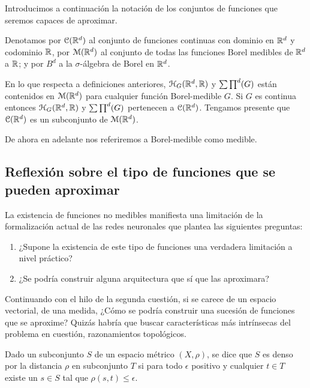 Introducimos a continuación la notación de los conjuntos de funciones que seremos capaces de aproximar.  

Denotamos por  $\mathcal{C}(\mathbb{R}^d)$ al conjunto de funciones continuas con dominio en $\mathbb{R}^d$ y codominio $\mathbb{R}$,
por  $\mathcal{M}(\mathbb{R}^d)$ al conjunto de todas las funciones Borel medibles de $\mathbb{R}^d$ a $\mathbb{R}$; 
y por $B^d$ a la $\sigma$-álgebra de Borel en $\mathbb{R} ^d$. 

En lo que respecta a definiciones anteriores, $\mathcal{H}_G(\mathbb{R}^d,\mathbb{R})$ y $\sum \prod^d (G)$ están contenidos en
$\mathcal{M}(\mathbb{R}^d)$ para cualquier función Borel-medible $G$. Si $G$ es continua entonces 
$\mathcal{H}_G(\mathbb{R}^d,\mathbb{R})$ y $\sum \prod^d (G)$ pertenecen a $\mathcal{C}(\mathbb{R}^d)$. Tengamos presente que $\mathcal{C}(\mathbb{R}^d)$ es un subconjunto
de $\mathcal{M}(\mathbb{R}^d)$.  

De ahora en adelante nos referiremos a Borel-medible como medible. 
  

\subsection{ Reflexión sobre el tipo de funciones que se pueden aproximar}

La existencia de funciones no medibles manifiesta una limitación
de la formalización actual de las redes neuronales que plantea las siguientes 
preguntas: 
\begin{enumerate}
    \item ¿Supone la existencia de este tipo de funciones una verdadera limitación a nivel práctico?
    \item ¿Se podría construir alguna arquitectura que sí que las aproximara?
\end{enumerate}  

Continuando con el hilo de la segunda cuestión, si se carece de un espacio vectorial, 
de una medida,  ¿Cómo se podría construir una sucesión de funciones que se aproxime?
Quizás habría que buscar características más intrínsecas del problema en cuestión, 
razonamientos topológicos.

\begin{definicion} 
    \reversemarginpar 
    \setlength{\marginparwidth}{\smallMarginSize}
    \normalmarginpar

    Dado un subconjunto $S$ de un espacio métrico $(X, \rho)$, se dice que $S$ es denso por la distancia $\rho$
    en subconjunto $T$ si para todo $\epsilon$ positivo y cualquier $t \in T$ existe un $s \in S$ tal 
    que $\rho(s,t) \leq \epsilon$. 
\end{definicion}

